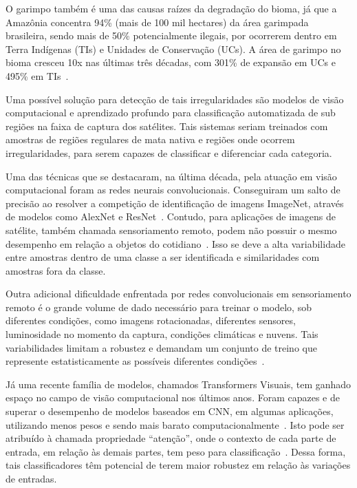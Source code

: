 O garimpo também é uma das causas raízes da degradação do bioma, já que a Amazônia concentra 94\% (mais de 100 mil hectares) da área garimpada brasileira, sendo mais de 50\% potencialmente ilegais, por ocorrerem dentro em Terra Indígenas (TIs) e Unidades de Conservação (UCs). A área de garimpo no bioma cresceu 10x nas últimas três décadas, com 301\% de expansão em UCs e 495\% em TIs~\cite{mapbiomasgarimpo}.


Uma possível solução para detecção de tais irregularidades são modelos de visão computacional e aprendizado profundo para classificação automatizada de sub regiões na faixa de captura dos satélites. Tais sistemas seriam treinados com amostras de regiões regulares de mata nativa e regiões onde ocorrem irregularidades, para serem capazes de classificar e diferenciar cada categoria.

Uma das técnicas que se destacaram, na última década, pela atuação em visão computacional foram as redes neurais convolucionais. Conseguiram um salto de precisão ao resolver a competição de identificação de imagens ImageNet, através de modelos como AlexNet e ResNet~\cite{alom2018history}. Contudo, para aplicações de imagens de satélite, também chamada sensoriamento remoto, podem não possuir o mesmo desempenho em relação a objetos do cotidiano~\cite{wang2022empirical}. Isso se deve a alta variabilidade entre amostras dentro de uma classe a ser identificada e similaridades com amostras fora da classe.

Outra adicional dificuldade enfrentada por redes convolucionais em sensoriamento remoto é o grande volume de dado necessário para treinar o modelo, sob diferentes condições, como imagens rotacionadas, diferentes sensores, luminosidade no momento da captura, condições climáticas e nuvens. Tais variabilidades limitam a robustez e demandam um conjunto de treino que represente estatisticamente as possíveis diferentes condições~\cite{5782957}.

Já uma recente família de modelos, chamados Transformers Visuais, tem ganhado espaço no campo de visão computacional nos últimos anos. Foram capazes e de superar o desempenho de modelos baseados em CNN, em algumas aplicações, utilizando menos pesos e sendo mais barato computacionalmente~\cite{wang2022empirical}. Isto pode ser atribuído à chamada propriedade “atenção”, onde o contexto de cada parte de entrada, em relação às demais partes, tem peso para classificação~\cite{dosovitskiy2020image}. Dessa forma, tais classificadores têm potencial de terem maior robustez em relação às variações de entradas.


